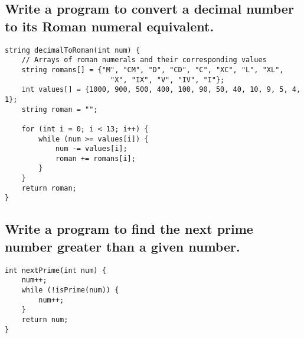 \subsection{Write a program to convert a decimal number to its Roman numeral equivalent.}
\begin{tcolorbox}[title=]
\begin{verbatim}
string decimalToRoman(int num) {
    // Arrays of roman numerals and their corresponding values
    string romans[] = {"M", "CM", "D", "CD", "C", "XC", "L", "XL",
                         "X", "IX", "V", "IV", "I"};
    int values[] = {1000, 900, 500, 400, 100, 90, 50, 40, 10, 9, 5, 4, 1};
    string roman = "";
    
    for (int i = 0; i < 13; i++) {
        while (num >= values[i]) {
            num -= values[i];
            roman += romans[i];
        }
    }
    return roman;
}
\end{verbatim}
\end{tcolorbox}


\subsection{Write a program to find the next prime number greater than a given number.}
\begin{tcolorbox}[title=]
\begin{verbatim}
int nextPrime(int num) {
    num++;
    while (!isPrime(num)) {
        num++;
    }
    return num;
}
\end{verbatim}
\end{tcolorbox}



































